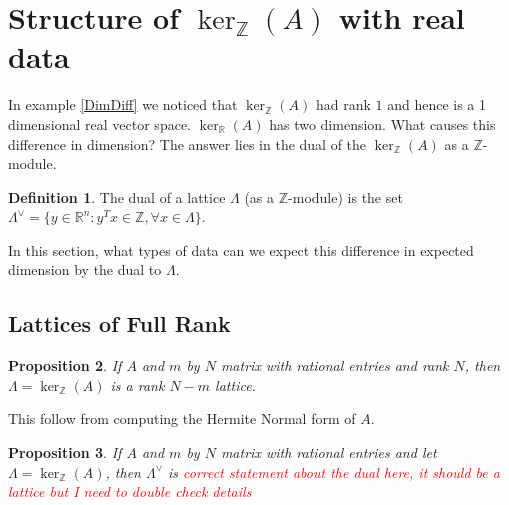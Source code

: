 \documentclass{article}
\newcommand{\Z}[0]{\mathbb{Z}}		%
\newcommand{\R}[0]{\mathbb{R}}		%
\newtheorem{thm}{Theorem}[section]
\newtheorem{prop}[thm]{Proposition}
\theoremstyle{definition}
\newtheorem{defn}[thm]{Definition}
\theoremstyle{remark}
\begin{document}
\section{Structure of $\ker_\Z(A)$ with real data}
In example \ref{DimDiff} we noticed that $\ker_\Z(A)$ had rank $1$ and hence is a 1 dimensional real vector space. $\ker_\R(A)$ has two dimension. What causes this difference in dimension?  The answer lies in the dual of the $\ker_\Z(A)$ as a $\Z$-module. 
\begin{defn}
The dual of a lattice $\Lambda$ (as a $\Z$-module) is the set $\Lambda^\vee = \{ y\in \R^n: y^Tx \in \Z ,\forall x \in \Lambda\} $. %
\end{defn}
In this section, what types of data can we expect this difference in expected dimension by the dual to $\Lambda$. %
\subsection{Lattices of Full Rank}
\begin{prop}
If $A$ and $m$ by $N$ matrix with rational entries and rank $N$, then $\Lambda= \ker_\Z(A)$ is a rank $N-m$ lattice.
\end{prop}
This follow from computing the Hermite Normal form of $A$. 
\begin{prop}
If $A$ and $m$ by $N$ matrix with rational entries and let  $\Lambda= \ker_\Z(A)$, then $\Lambda^\vee$ is \textcolor{red}{correct statement about the dual here, it should be a lattice but I need to double check details}%
\end{prop}

\end{document}
